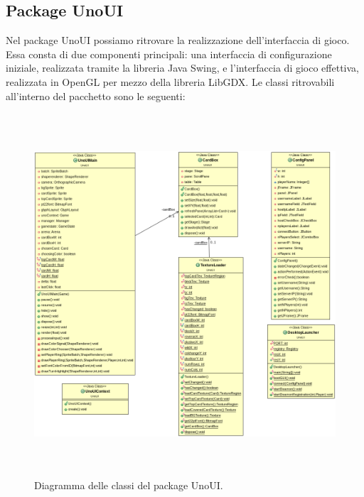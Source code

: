 \documentclass[11pt]{article} %
\begin{document}
\subsection{Package UnoUI}
Nel package UnoUI possiamo ritrovare la realizzazione dell'interfaccia di gioco. Essa consta di due componenti principali: una interfaccia di configurazione iniziale, realizzata tramite la libreria Java Swing, e l'interfaccia di gioco effettiva, realizzata in OpenGL per mezzo della libreria LibGDX. Le classi ritrovabili all'interno del pacchetto sono le seguenti:
\begin{figure}[h]
\centering%
\includegraphics[height=13.5cm, width=14cm, keepaspectratio]{UnoUI.png}%
\caption{Diagramma delle classi del package UnoUI.}
\end{figure}
\end{document}
